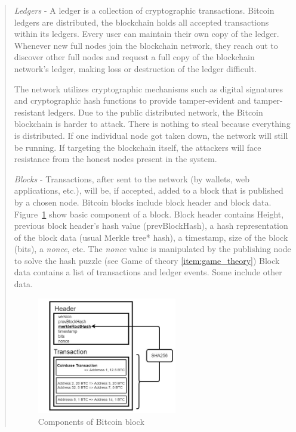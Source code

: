 \begin{itemize}
\begin{quote}
	\emph{Ledgers} - 
	A ledger is a collection of cryptographic transactions. 
	Bitcoin ledgers are distributed, the blockchain holds all accepted transactions within its ledgers. Every user can maintain their own copy of the ledger.
	Whenever new full nodes join the blockchain network, they reach out to discover other full nodes and request a full copy of the blockchain network’s ledger, making loss or destruction of the ledger difficult.
	\bigbreak
	
	The network utilizes cryptographic mechanisms such as digital signatures and cryptographic hash functions to provide tamper-evident and tamper-resistant ledgers.
	Due to the public distributed network, the Bitcoin blockchain is harder to attack. There is nothing to steal because everything is distributed. If one individual node got taken down, the network will still be running. 
	If targeting the blockchain itself, the attackers will face resistance from the honest nodes present in the system. 
	\bigbreak

	\emph{Blocks} -	
	Transactions, after sent to the network (by wallets, web applications, etc.), will be, if accepted, added to a block that is published by a chosen node. 
	Bitcoin blocks include block header and block data.
	Figure~\ref{fig:block_component} show basic component of a block.
	Block header contains Height, previous block header’s hash value (prevBlockHash), a hash representation of the block data (usual Merkle tree* hash), a timestamp, size of the block (bits), a \emph{nonce}, etc.
	The \emph{nonce} value is manipulated by the publishing node to solve the hash puzzle (see Game of theory \ref{item:game_theory})
	Block data contains a list of transactions and ledger events. Some include other data.
	\pagebreak

	\begin{figure}[h!]
		\centering
		\includegraphics[width=0.6\textwidth]{images/block_component.jpg}
		\caption[Components of Bitcoin block]{Components of Bitcoin block}
		\label{fig:block_component}
	\end{figure}


\end{quote}
\end{itemize}
